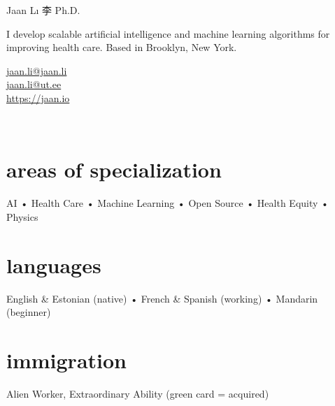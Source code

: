 \documentclass[4pt, letterpaper]{article}
\begin{document}
{\Huge Jaan Lı 李 Ph.D.}\\[0.5cm]
\begin{minipage}[ht]{0.5\textwidth}
I develop scalable artificial intelligence and machine learning algorithms for improving health care. Based in Brooklyn, New York.
\end{minipage}
\hspace{2cm}\begin{minipage}[ht]{0.55\textwidth}
\vspace*{0.35cm}
\hspace*{-0.3mm}\textsc{\faEnvelope} \hspace*{1.8 mm} \href{mailto:jaan.li@jaan.li}{jaan.li@jaan.li}\\
\hspace*{-0.3mm}\textsc{\faGraduationCap} \hspace*{0.9 mm} \href{mailto:jaan.li@ut.ee}{jaan.li@ut.ee}\\
\faGlobe \hspace{4.5 mm} \href{jaan.io}{https://jaan.io}\\
\end{minipage}\\
\vspace{0.5cm}
\section*{areas of specialization}
AI • Health Care • Machine Learning • Open Source • Health Equity • Physics

\section*{languages}
English \& Estonian (native) • French \& Spanish (working) • Mandarin (beginner)

\section*{immigration}
Alien Worker, Extraordinary Ability (green card = acquired)
\end{document}

